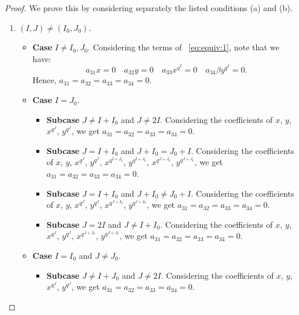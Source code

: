 \documentclass[11pt]{article}
\theoremstyle{definition}
\numberwithin{equation}{section}
\begin{document}
\begin{proof}
We prove this by considering separately the listed conditions (a) and (b).

\begin{enumerate}
    \item  $(I,J)\neq (I_0, J_0)$.

\begin{itemize}
    \item \textbf{Case} $I \neq I_0, J_0$.
    Considering the terms of ~\eqref{eq:equiv:1}, note that we have:
    \begin{equation*}
    a_{31} x=0 \quad
    a_{32}  y =0\quad
    a_{33} x^{q^I}=0\quad
a_{34}\beta  y ^{q^{I}}=0.
\end{equation*}
Hence, $a_{31} = a_{32} = a_{33} = a_{34} = 0$.

    \item \textbf{Case} $I = J_0$.

\begin{itemize}
    \item \textbf{Subcase} $J\neq I + I_0$ and $J\neq 2I$.
    Considering the coefficients of $x$, $ y $, $x^{q^J}$, $ y ^{q^J}$, we get $a_{31} = a_{32} = a_{33} = a_{34} = 0$.

\item \textbf{Subcase} $J = I + I_0$ and $J + I_0 = J_0 + I$.
Considering the coefficients of $x$, $ y $, $x^{q^J}$, $ y ^{q^J}$, $x^{q^{I+J_0}}$, $ y ^{q^{I+J_0}}$, $x^{q^{J+J_0}}$, $ y ^{q^{J+J_0}}$, we get
$a_{31} = a_{32} = a_{33} = a_{34} = 0$.

\item \textbf{Subcase} $J = I + I_0$ and $J + I_0 \neq J_0 + I$.
Considering the coefficients of $x$, $ y $, $x^{q^J}$, $ y ^{q^J}$,  $x^{q^{J+I_0}}$, $ y ^{q^{J+I_0}}$, we get
 $a_{31} = a_{32} = a_{33} = a_{34} = 0$.

\item \textbf{Subcase} $J = 2I$ and $J\neq I+I_0$.
Considering the coefficients of $x$, $ y $, $x^{q^J}$, $ y ^{q^J}$,  $x^{q^{J+J_0}}$, $ y ^{q^{J+J_0}}$, we get
$a_{31} = a_{32} = a_{33} = a_{34} = 0$.
\end{itemize}

\item \textbf{Case} $I = I_0$ and $J \neq J_0$.
\begin{itemize}
    \item \textbf{Subcase} $J\neq I + J_0$ and $J\neq 2I$.
Considering the coefficients of $x$, $ y $, $x^{q^J}$, $ y ^{q^J}$, we get
$a_{31} = a_{32} = a_{33} = a_{34} = 0$.


\end{itemize}
\end{itemize}
\end{enumerate}
\end{proof}
\end{document}
